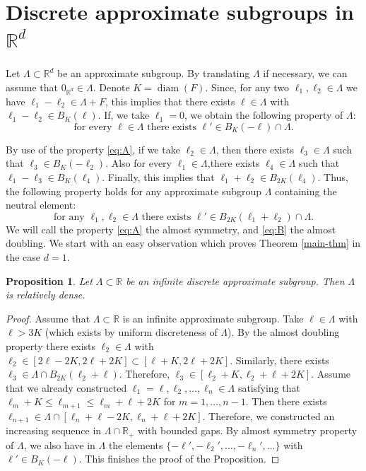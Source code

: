 \documentclass[10pt]{amsart}
\DeclareMathOperator{\diam}{diam}
\newcommand{\bR}{\mathbb{R}}
\newcounter{dummy} \numberwithin{dummy}{section}
\theoremstyle{plain}
\newtheorem{prop}[dummy]{Proposition}
\theoremstyle{definition}
\begin{document}
\section{Discrete approximate subgroups in \texorpdfstring{$\bR^d$}{Rd}}

Let $\Lambda \subset \bR^d$ be an approximate subgroup. By translating $\Lambda$ if necessary, we can assume that $0_{\bR^d} \in \Lambda$.
Denote $K = \diam(F)$. Since, for any two $\ell_1,\ell_2 \in \Lambda$ we have $\ell_1 - \ell_2 \in \Lambda + F$, this implies that there exists $\ell \in \Lambda$ with $\ell_1 - \ell_2 \in B_K(\ell)$. If, we take $\ell_1 = 0$, we obtain the following property of $\Lambda$:
\begin{equation}\label{eq:A}
\tag{A} \text{for every $\ell \in \Lambda$ there exists $\ell' \in B_{K}(-\ell) \cap \Lambda$.}
\end{equation}

By use of the property \eqref{eq:A}, if we take $ \ell_2 \in \Lambda$, then there exists $\ell_3 \in \Lambda$ such that $\ell_3 \in B_K(-\ell_2)$. Also for every $\ell_1 \in \Lambda$,there exists $\ell_4 \in \Lambda$ such that $\ell_1 - \ell_3 \in B_K(\ell_4)$. Finally, this implies that $\ell_1 + \ell_2 \in B_{2K}(\ell_4)$. Thus, the following property holds for any approximate subgroup $\Lambda$ containing the neutral element:
\begin{equation}\label{eq:B}
\tag{B} \text{for any $\ell_1, \ell_2 \in \Lambda$ there exists $\ell' \in B_{2K}(\ell_1 + \ell_2) \cap \Lambda$.}
\end{equation}
We will call the property \eqref{eq:A} the almost symmetry, and \eqref{eq:B} the almost doubling.
We start with an easy observation which proves Theorem \ref{main-thm} in the case $d=1$.

\begin{prop}\label{simple-prop}
Let $\Lambda \subset \bR$ be an infinite discrete approximate subgroup. Then $\Lambda$ is relatively dense.
\end{prop}
\begin{proof}
Assume that $\Lambda \subset \bR$ is an infinite approximate subgroup. Take $\ell \in \Lambda$ with $\ell > 3K$ (which exists by uniform discreteness of $\Lambda$). By the almost doubling property there exists $\ell_2 \in \Lambda$ with $\ell_2 \in [2\ell-2K, 2 \ell + 2K] \subset [\ell + K, 2 \ell+2K]$. Similarly, there exists $\ell_3 \in \Lambda \cap B_{2K}(\ell_2 + \ell)$. Therefore, $\ell_3 \in [\ell_2+K, \ell_2 + \ell + 2K]$. Assume that we already constructed $\ell_1 = \ell, \ell_2,\ldots,\ell_{n} \in \Lambda$ satisfying that $\ell_m + K \leq \ell_{m+1} \leq \ell_m + \ell + 2K$ for $m=1,\ldots,n-1 $. Then there exists $\ell_{n+1} \in \Lambda \cap [\ell_n + \ell - 2K, \ell_n + \ell + 2K]$. Therefore, we constructed an increasing sequence in $\Lambda \cap \bR_{+}$ with bounded gaps. By almost symmetry property of $\Lambda$, we also have in $\Lambda$ the elements $\{-\ell',-\ell_2',\ldots,-\ell_n',\ldots\}$ with $\ell' \in B_{K}(-\ell)$. This finishes the proof of the Proposition.
\end{proof}
\end{document}
